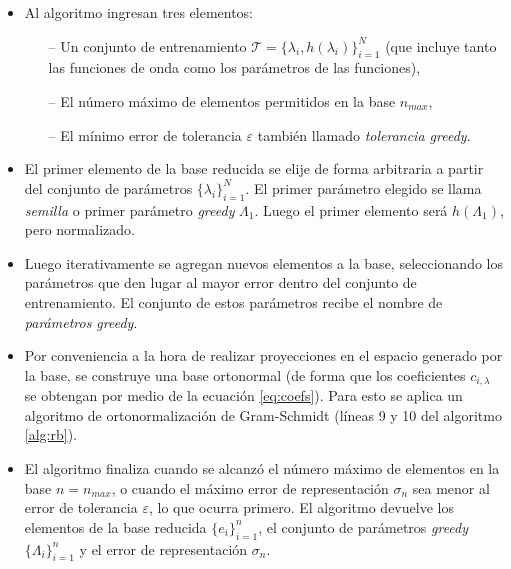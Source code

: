 \begin{itemize}
\item Al algoritmo ingresan tres elementos:
	\begin{itemize}
	\item [--] Un conjunto de entrenamiento $\mathcal{T} = \{ \lambda_{i}, h(\lambda_i) \}_{i=1}^N$ (que incluye tanto las funciones de onda como los parámetros de las funciones), 
	\item[--] El número máximo de elementos permitidos en la base $n_{max}$,
	\item[--] El mínimo error de tolerancia $\varepsilon$ también llamado \textit{tolerancia greedy}.
	\end{itemize}

\item El primer elemento de la base reducida se elije de forma arbitraria a partir del conjunto de parámetros $\{\lambda_{i}\}_{i=1}^N$. El primer parámetro elegido se llama \textit{semilla} o primer parámetro \textit{greedy} $\Lambda_1$. Luego el primer elemento será $h(\Lambda_1)$, pero normalizado.
\item Luego iterativamente se agregan nuevos elementos a la base, seleccionando los parámetros que den lugar al mayor error dentro del conjunto de entrenamiento. El conjunto de estos parámetros recibe el nombre de \textit{parámetros greedy}.
\item Por conveniencia a la hora de realizar proyecciones en el espacio generado por la base, se construye una base ortonormal (de forma que los coeficientes $c_{i,\lambda}$ se obtengan por medio de la ecuación \eqref{eq:coefs}). Para esto se aplica un algoritmo de ortonormalización de Gram-Schmidt (líneas 9 y 10 del algoritmo \ref{alg:rb}).
\item El algoritmo finaliza cuando se alcanzó el número máximo de elementos en la base $n = n_{max}$, o cuando el máximo error de representación $\sigma_n$ sea menor al error de tolerancia $\varepsilon$, lo que ocurra primero. El algoritmo devuelve los elementos de la base reducida $\{ e_i\}_{i=1}^{n}$, el conjunto de parámetros \textit{greedy} $\{\Lambda_i\}_{i=1}^{n}$ y el error de representación $\sigma_n$.
\end{itemize}

